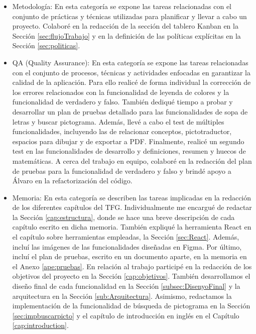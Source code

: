 \begin{itemize}
    \item Metodología: En esta categoría se expone las tareas relacionadas con el conjunto de prácticas y técnicas utilizadas para planificar y llevar a cabo un proyecto. Colaboré en la redacción de la sección del tablero Kanban en la Sección \ref{sec:flujoTrabajo} y en la definición de las políticas explícitas en la Sección \ref{sec:politicas}.
    \item QA (Quality Assurance): En esta categoría se expone las tareas relacionadas con el conjunto de procesos, técnicas y actividades enfocadas en garantizar la calidad de la aplicación. Para ello realicé de forma individual la corrección de los errores relacionados con la funcionalidad de leyenda de colores y la funcionalidad de verdadero y falso. También dediqué tiempo a probar y desarrollar un plan de pruebas detallado para las funcionalidades de sopa de letras y buscar pictograma. Además, llevé a cabo el test de múltiples funcionalidades, incluyendo las de relacionar conceptos, pictotraductor, espacios para dibujar y de exportar a PDF. Finalmente, realicé un segundo test en las funcionalidades de desarrollo y definiciones, resumen y huecos de matemáticas. A cerca del trabajo en equipo, colaboré en la redacción del plan de pruebas para la funcionalidad de verdadero y falso y brindé apoyo a Álvaro en la refactorización del código.
    \item Memoria: En esta categoría se describen las tareas implicadas en la redacción de los diferentes capítulos del TFG. Individualmente me encargué de redactar la Sección \ref{cap:estructura}, donde se hace una breve descripción de cada capítulo escrito en dicha memoria. También expliqué la herramienta React en el capítulo sobre herramientas empleadas, la Sección \ref{sec:React}. Además, incluí las imágenes de las funcionalidades diseñadas en Figma. Por último, incluí el plan de pruebas, escrito en un documento aparte, en la memoria en el Anexo \ref{ape:pruebas}. En relación al trabajo participé en la redacción de los objetivos del proyecto en la Sección \ref{cap:objetivos}. También desarrollamos el diseño final de cada funcionalidad en la Sección \ref{subsec:DisenyoFinal} y la arquitectura en la Sección \ref{sub:Arquitectura}. Asimismo, redactamos la implementación de la funcionalidad de búsqueda de pictograma en la Sección \ref{sec:impbuscarpicto} y el capítulo de introducción en inglés en el Capítulo \ref{cap:introduction}.

\end{itemize}


